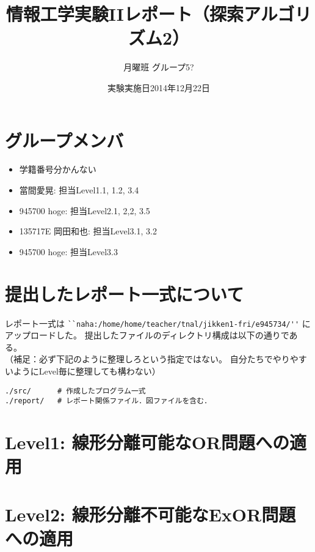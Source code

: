 \documentclass[10pt]{jarticle}
\begin{document}
\title{情報工学実験IIレポート（探索アルゴリズム2）}
\author{ 月曜班  グループ5?} %
\date{実験実施日2014年12月22日}

\maketitle


\section*{グループメンバ}
\begin{itemize}
 \item 学籍番号分かんない
 \item  當間愛晃: 担当Level1.1, 1.2, 3.4
 \item 945700 hoge: 担当Level2.1, 2,2, 3.5
 \item 135717E 岡田和也: 担当Level3.1, 3.2
 \item 945700 hoge: 担当Level3.3
\end{itemize}

\section*{提出したレポート一式について}
レポート一式は
\verb|``naha:/home/home/teacher/tnal/jikken1-fri/e945734/''|
にアップロードした。
提出したファイルのディレクトリ構成は以下の通りである。\\
（補足：必ず下記のように整理しろという指定ではない。
自分たちでやりやすいようにLevel毎に整理しても構わない）
\begin{breakbox}
\begin{verbatim}
./src/      # 作成したプログラム一式
./report/   # レポート関係ファイル．図ファイルを含む．
\end{verbatim}
\end{breakbox}

\newpage

\section{Level1: 線形分離可能なOR問題への適用}


\newpage

\section{Level2: 線形分離不可能なExOR問題への適用}

\end{document}
